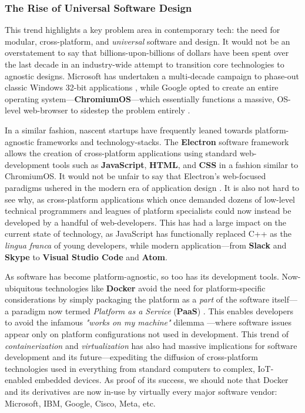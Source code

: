 \documentclass{report}
\newcommand{\tech}[1]{\textbf{#1}}
\begin{document}
\subsubsection{The Rise of Universal Software Design}

This trend highlights a key problem area in contemporary tech: the need for modular, cross-platform, and \emph{universal} software and design. It would not be an overstatement to say that billions-upon-billions of dollars have been spent over the last decade in an industry-wide attempt to transition core technologies to agnostic designs. Microsoft has undertaken a multi-decade campaign to phase-out classic Windows 32-bit applications \cite{Foley_2020}, while Google opted to create an entire operating system---\tech{ChromiumOS}---which essentially functions a massive, OS-level web-browser to sidestep the problem entirely \cite{chrome}. 

In a similar fashion, nascent startups have frequently leaned towards platform-agnostic frameworks and technology-stacks. The \tech{Electron} software framework allows the creation of cross-platform applications using standard web-development tools such as \tech{JavaScript}, \tech{HTML}, and \tech{CSS} in a fashion similar to ChromiumOS. It would not be unfair to say that Electron's web-focused paradigms ushered in the modern era of application design \cite{Alexander_2024}. It is also not hard to see why, as cross-platform applications which once demanded dozens of low-level technical programmers and leagues of platform specialists could now instead be developed by a handful of web-developers. This has had a large impact on the current state of technology, as JavaScript has functionally replaced C++ as the \emph{lingua franca} of young developers, while modern application---from \tech{Slack} and \tech{Skype} to \tech{Visual Studio Code} and \tech{Atom}.  

As software has become platform-agnostic, so too has its development tools. Now-ubiquitous technologies like \tech{Docker} avoid the need for platform-specific considerations by simply packaging the platform as a \emph{ part} of the software itself---a paradigm now termed \emph{Platform as a Service} (\tech{PaaS}) \cite{kolb2019portability}. This enables developers to avoid the infamous \emph{"works on my machine"} dilemma \cite{Yadav_2021}---where software issues appear only on platform configurations not used in development. This trend of \emph{containerization} and \emph{virtualization} has also had massive implications for software development and its future---expediting the diffusion of cross-platform technologies used in everything from standard computers to complex, IoT-enabled embedded devices. As proof of its success, we should note that Docker and its derivatives are now in-use by virtually every major software vendor: Microsoft, IBM, Google, Cisco, Meta, etc.
\end{document}
